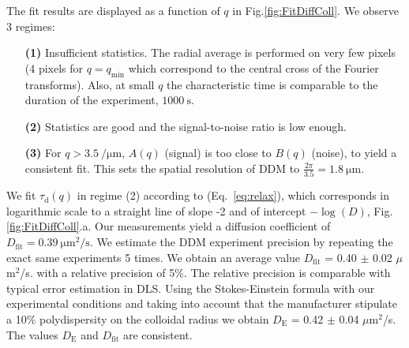 \documentclass[prb,twocolumn,amsmath,amssymb]{revtex4-1}
\newcommand{\tgn}[1]{{\color{blue}#1}} %
\begin{document}
The fit results are displayed  as a function of $q$ in Fig.\ref{fig:FitDiffColl}. We observe 3 regimes:
\begin{itemize}
\item[\textbf{(1)}] Insufficient statistics. The radial average is performed on very few pixels (4 pixels for $q = q_\text{min}$ which correspond to the central cross of the Fourier transforms).  Also, at small $q$ the characteristic time is comparable to the duration of the experiment, $\SI{1000}{\second}$.
\item[\textbf{(2)}] Statistics are good and the signal-to-noise ratio is low enough.
\item[\textbf{(3)}] For  $q>\SI{3.5}{\per\micro\meter}$, $A(q)$ (signal) is too close to $B(q)$ (noise), to yield a consistent fit. This sets the spatial resolution of DDM to  $\frac{2\pi}{3.5} = \SI{1.8}{\micro\meter}$.
\end{itemize}

We fit $\tau_\text{d}(q)$ in regime (2) according to (Eq.~\ref{eq:relax}), which corresponds in logarithmic scale to a straight line of slope -2 and of intercept $-\log(D)$, Fig.\ref{fig:FitDiffColl}.a. Our measurements yield a diffusion coefficient of $D_\text{fit} = \SI{0.39}{\micro\meter\squared\per\second}$. \tgn{We estimate the DDM experiment precision by repeating the exact same experiments 5 times. We obtain an average value $D_\text{fit}$ = 0.40 $\pm$ 0.02 $\mu$m$^2$/s. with a relative precision of 5\%. The relative precision is comparable with typical error estimation in DLS\cite{Kayori2008}.} \tgn{Using the Stokes-Einstein formula with our experimental conditions and taking into account that the manufacturer stipulate a 10\% polydispersity on the colloidal radius we obtain $D_\text{E}$ = 0.42 $\pm$ 0.04 $\mu$m$^2$/s. The values $D_\text{E}$ and $D_\text{fit}$ are consistent.} 
\end{document}
